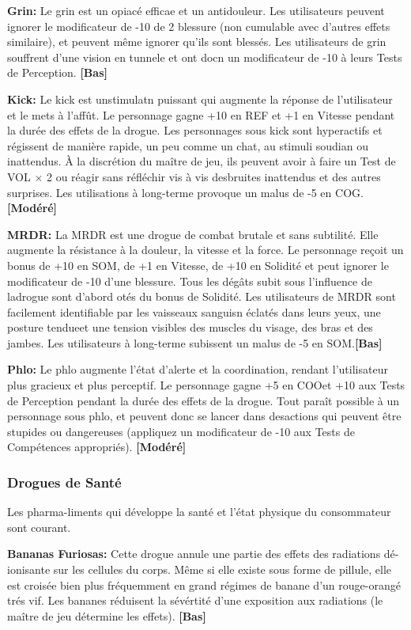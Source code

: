 \textbf{Grin:} Le grin est un opiacé efficae et un antidouleur. Les utilisateurs peuvent ignorer le modificateur de -10 de 2 blessure (non cumulable avec d'autres effets similaire), et peuvent même ignorer qu'ils sont blessés. Les utilisateurs de grin souffrent d'une vision en tunnele et ont docn un modificateur de -10 à leurs Tests de Perception. \textbf{[Bas]} 

\textbf{Kick:} Le kick est unstimulatn puissant qui augmente la réponse de l'utilisateur et le mets à l'affût. Le personnage gagne +10 en REF et +1 en Vitesse pendant la durée des effets de la drogue. Les personnages sous kick sont hyperactifs et régissent de manière rapide, un peu comme un chat, au stimuli soudian ou inattendus. À la discrétion du maître de jeu, ils peuvent avoir à faire un Test de VOL $\times$ 2 ou réagir sans réfléchir vis à vis desbruites inattendus et des autres surprises. Les utilisations à long-terme provoque un malus de -5 en COG. \textbf{[Modéré]} 

\textbf{MRDR:} La MRDR est une drogue de combat brutale et sans subtilité. Elle augmente la résistance à la douleur, la vitesse et la force. Le personnage reçoit un bonus de +10 en SOM, de +1 en Vitesse, de +10 en Solidité et peut ignorer le modificateur de -10 d'une blessure. Tous les dégâts subit sous l'influence de ladrogue sont d'abord otés du bonus de Solidité. Les utilisateurs de MRDR sont facilement identifiable par les vaisseaux sanguisn éclatés dans leurs yeux, une posture tendueet une tension visibles des muscles du visage, des bras et des jambes. Les utilisateurs à long-terme subissent un malus de -5 en SOM.\textbf{[Bas]} 

\textbf{Phlo:} Le phlo augmente l'état d'alerte et la coordination, rendant l'utilisateur plus gracieux et plus perceptif. Le personnage gagne +5 en COOet +10 aux Tests de Perception pendant la durée des effets de la drogue. Tout paraît possible à un personnage sous phlo, et peuvent donc se lancer dans desactions qui peuvent être stupides ou dangereuses (appliquez un modificateur de -10 aux Tests de Compétences appropriés). \textbf{[Modéré]} 

\subsubsection{Drogues de Santé} 

Les pharma-liments qui développe la santé et l'état physique du consommateur sont courant. 

\textbf{Bananas Furiosas:} Cette drogue annule une partie des effets des radiations dé-ionisante sur les cellules du corps. Même si elle existe sous forme de pillule, elle est croisée bien plus fréquemment en grand régimes de banane d'un rouge-orangé trés vif. Les bananes réduisent la sévértité d'une exposition aux radiations (le maître de jeu détermine les effets). \textbf{[Bas]} 

